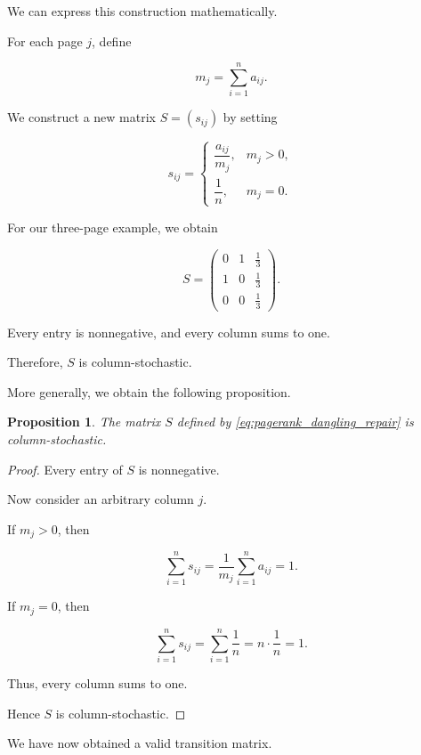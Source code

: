 \documentclass[11pt,a4paper]{article}
\newtheorem{proposition}[theorem]{Proposition}
\theoremstyle{definition}
\theoremstyle{remark}
\begin{document}
We can express this
construction mathematically.

For each page $j$, define

\[
m_j=\sum_{i=1}^{n}a_{ij}.
\]

We construct a new matrix
$S=(s_{ij})$ by setting

\begin{equation}
s_{ij}=
\begin{cases}
\dfrac{a_{ij}}{m_j},
& m_j>0,\\[3mm]
\dfrac{1}{n},
& m_j=0.
\end{cases}
\label{eq:pagerank_dangling_repair}
\end{equation}

For our three-page example,
we obtain

\begin{equation}
\boxed{
S=
\begin{pmatrix}
0&1&\frac13\\[1mm]
1&0&\frac13\\[1mm]
0&0&\frac13
\end{pmatrix}.
}
\label{eq:pagerank_repaired_example}
\end{equation}

Every entry is nonnegative,
and every column sums to one.

Therefore, $S$ is
column-stochastic.

More generally, we obtain
the following proposition.

\begin{proposition}
The matrix $S$ defined by
\eqref{eq:pagerank_dangling_repair}
is column-stochastic.
\end{proposition}

\begin{proof}

Every entry of $S$
is nonnegative.

Now consider an arbitrary
column $j$.

If $m_j>0$, then

\[
\sum_{i=1}^{n}s_{ij}
=
\frac{1}{m_j}
\sum_{i=1}^{n}a_{ij}
=
1.
\]

If $m_j=0$, then

\[
\sum_{i=1}^{n}s_{ij}
=
\sum_{i=1}^{n}\frac1n
=
n\cdot\frac1n
=
1.
\]

Thus, every column
sums to one.

Hence $S$ is
column-stochastic.

\end{proof}

We have now obtained
a valid transition matrix.
\end{document}

